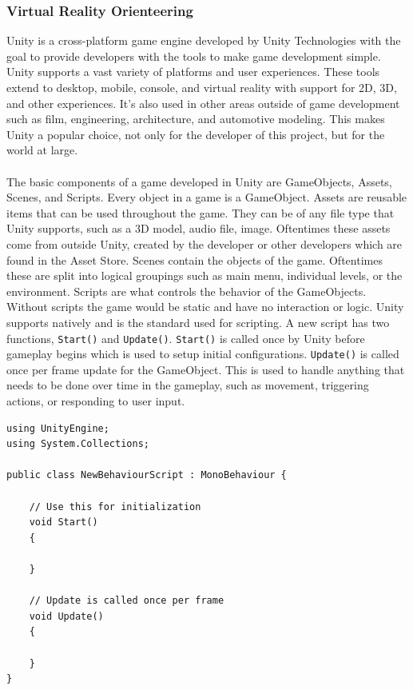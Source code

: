 \subsubsection{Virtual Reality Orienteering}
Unity is a cross-platform game engine developed by Unity Technologies with the goal to provide developers with the tools to make game development simple. Unity supports a vast variety of platforms and user experiences. These tools extend to desktop, mobile, console, and virtual reality with support for 2D, 3D, and other experiences. It's also used in other areas outside of game development such as film, engineering, architecture, and automotive modeling. This makes Unity a popular choice, not only for the developer of this project, but for the world at large.  \\
\\
The basic components of a game developed in Unity are GameObjects, Assets, Scenes, and Scripts. Every object in a game is a GameObject. Assets are reusable items that can be used throughout the game. They can be of any file type that Unity supports, such as a 3D model, audio file, image. Oftentimes these assets come from outside Unity, created by the developer or other developers which are found in the Asset Store. Scenes contain the objects of the game. Oftentimes these are split into logical groupings such as main menu, individual levels, or the environment. Scripts are what controls the behavior of the GameObjects. Without scripts the game would be static and have no interaction or logic. Unity supports \C natively and is the standard used for scripting. A new script has two functions, \lstinline{Start()} and \lstinline{Update()}. \lstinline{Start()} is called once by Unity before gameplay begins which is used to setup initial configurations. \lstinline{Update()} is called once per frame update for the GameObject. This is used to handle anything that needs to be done over time in the gameplay, such as movement, triggering actions, or responding to user input.  

\begin{lstlisting}[caption=New Script in Unity]
using UnityEngine;
using System.Collections;

public class NewBehaviourScript : MonoBehaviour {

	// Use this for initialization
	void Start()
	{
	
	}
	
	// Update is called once per frame
	void Update() 
	{
	
	}
}
\end{lstlisting}


